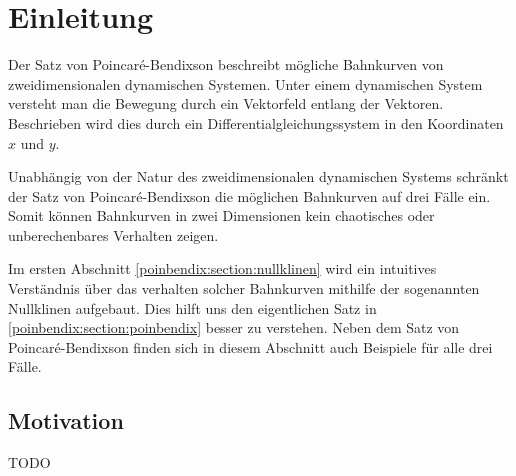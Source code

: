 \section{Einleitung} \label{poinbendix:section:einleitung}

Der Satz von Poincaré-Bendixson beschreibt mögliche Bahnkurven von zweidimensionalen dynamischen Systemen.
Unter einem dynamischen System versteht man die Bewegung durch ein Vektorfeld entlang der Vektoren.
Beschrieben wird dies durch ein Differentialgleichungssystem in den Koordinaten $x$ und $y$.

Unabhängig von der Natur des zweidimensionalen dynamischen Systems schränkt der Satz von Poincaré-Bendixson die möglichen Bahnkurven auf drei Fälle ein.
Somit können Bahnkurven in zwei Dimensionen kein chaotisches oder unberechenbares Verhalten zeigen.

Im ersten Abschnitt \ref{poinbendix:section:nullklinen} wird ein intuitives Verständnis über das verhalten solcher Bahnkurven mithilfe der sogenannten Nullklinen aufgebaut.
Dies hilft uns den eigentlichen Satz in \ref{poinbendix:section:poinbendix} besser zu verstehen.
Neben dem Satz von Poincaré-Bendixson finden sich in diesem Abschnitt auch Beispiele für alle drei Fälle.

\subsection{Motivation}
TODO
